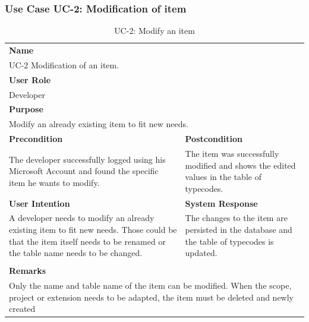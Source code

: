 \subsubsection{Use Case UC-2: Modification of item}\label{subsubsec:use-case-uc-2:-modification of-item}

\begin{table}[H]
    \centering
    \begin{tabular}{|p{}|p{}|}

        \hline
        \multicolumn{2}{|l|}{\rowcolor{gray!50}\textbf{Name}} \\
        \multicolumn{2}{|l|}{UC-2 Modification of an item.} \\ \hline

        \multicolumn{2}{|l|}{\rowcolor{gray!50}\textbf{User Role}} \\
        \multicolumn{2}{|l|}{Developer} \\ \hline

        \multicolumn{2}{|l|}{\rowcolor{gray!50}\textbf{Purpose}} \\
        \multicolumn{2}{|l|}{Modify an already existing item to fit new needs.} \\ \hline

        \rowcolor{gray!50}\textbf{Precondition} & \rowcolor{gray!50}\textbf{Postcondition} \\
        The developer successfully logged using his Microsoft Account and found the specific item he wants to modify.
        &
        The item was successfully modified and shows the edited values in the table of typecodes. \\ \hline

        \rowcolor{gray!50}\textbf{User Intention} & \rowcolor{gray!50}\textbf{System Response} \\
        A developer needs to modify an already existing item to fit new needs.
        Those could be that the item itself needs to be renamed or the table name needs to be changed.
        &
        The changes to the item are persisted in the database and the table of typecodes is updated. \\ \hline

        & \\ \hline

        \multicolumn{2}{|l|}{\rowcolor{gray!50}\textbf{Remarks}} \\
        \multicolumn{2}{|p{1\textwidth}|}{Only the name and table name of the item can be modified. When the scope, project or extension needs to be adapted, the item must be deleted and newly created } \\ \hline
    \end{tabular}
    \caption{UC-2: Modify an item}
    \label{tab:uc-2_modify-an-item}
\end{table}

